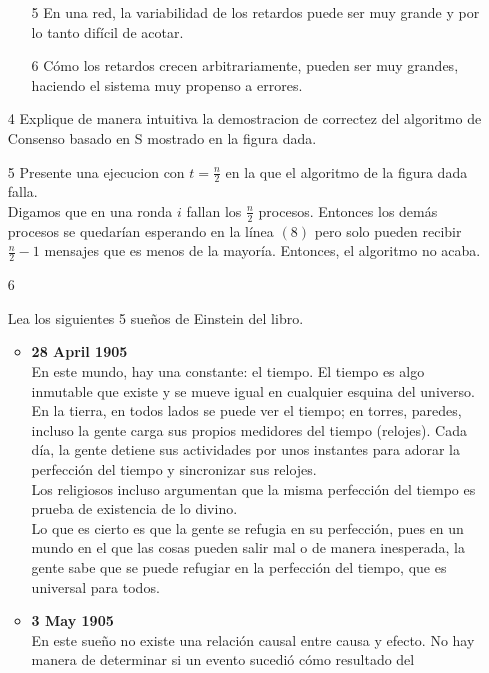 \documentclass[12pt,a4paper]{report}
\begin{document}
\begin{itemize}
{\begin{itemize}
        \item[5]{En una red, la variabilidad de los retardos puede ser muy
            grande y por lo tanto difícil de acotar.}
        \item[6]{Cómo los retardos crecen arbitrariamente, pueden ser muy
            grandes, haciendo el sistema muy propenso a errores.}
    \end{itemize}
}
\item[4]{Explique de manera intuitiva la demostracion de correctez del
    algoritmo de Consenso basado en S mostrado en la figura dada.
}
\item[5]{Presente una ejecucion con $t=\tfrac{n}{2}$ en la que el algoritmo
    de la figura dada falla.\\
    Digamos que en una ronda $i$ fallan los $\tfrac{n}{2}$ procesos. Entonces
    los demás procesos se quedarían esperando en la línea $(8)$ pero solo pueden
    recibir $\tfrac{n}{2}-1$ mensajes que es menos de la mayoría. Entonces, el
    algoritmo no acaba.
}
\item[6]{Lea los siguientes 5 sueños de Einstein del libro.
    \begin{itemize}[label=$\bullet$]
        \item{\textbf{28 April 1905}\\
            En este mundo, hay una constante: el tiempo. El tiempo es algo
            inmutable que existe y se mueve igual en cualquier esquina del
            universo. En la tierra, en todos lados se puede ver el tiempo; en
            torres, paredes, incluso la gente carga sus propios medidores del
            tiempo (relojes). Cada día, la gente detiene sus actividades por
            unos instantes para adorar la perfección del tiempo y sincronizar
            sus relojes.\\
            Los religiosos incluso argumentan que la misma perfección del tiempo
            es prueba de existencia de lo divino.\\
            Lo que es cierto es que la gente se refugia en su perfección, pues
            en un mundo en el que las cosas pueden salir mal o de manera
            inesperada, la gente sabe que se puede refugiar en la perfección del
            tiempo, que es universal para todos.
        }
        \item{\textbf{3 May 1905}\\
            En este sueño no existe una relación causal entre causa y efecto. No
            hay manera de determinar si un evento sucedió cómo resultado del
}
\end{itemize}}
\end{itemize}
\end{document}
